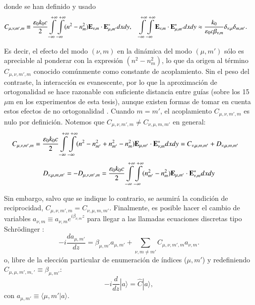 donde se han definido y usado
\begin{align*}
	   C_{\mu, \nu, m', m} &\equiv \frac{\epsilon_0 k_0 c}{2}\int\displaylimits_{-\infty}^{+\infty}\int\displaylimits_{-\infty}^{+\infty} (n^2 - n^2_{m}) \textbf{E}_{\nu, m} \cdot \textbf{E}_{\mu, m'}^* dxdy , \quad\int\displaylimits_{-\infty}^{+\infty}\int\displaylimits_{-\infty}^{+\infty} \textbf{E}_{\nu, m} \cdot \textbf{E}_{\mu, m'}^* dxdy \approx \frac{k_0}{\epsilon_0 c \beta_{\nu, m}} \delta_{\nu,\mu}\delta_{m,m'}.
\end{align*}

Es decir, el efecto del modo $(\nu, m)$ en la dinámica del modo $(\mu, m')$ sólo es apreciable al ponderar con la expresión $(n^2 - n^2_{m})$, lo que da origen al término $C_{\mu, \nu, m', m}$ conocido comúnmente como constante de acoplamiento. Sin el peso del contraste, la interacción es evanescente, por lo que la aproximación de ortogonalidad se hace razonable con suficiente distancia entre guías (sobre los 15 $\mu$m en los experimentos de esta tesis), aunque existen formas de tomar en cuenta estos efectos de no ortogonalidad \citep{schulz_geometric_2022}. Cuando $m=m'$, el acoplamiento $C_{\mu, \nu, m', m}$ es nulo por definición. Notemos que $C_{\mu, \nu, m', m} \neq C_{\nu, \mu, m, m'}$ en general:
\begin{align*}
	C_{\mu, \nu, m', m} &= \frac{\epsilon_0 k_0 c}{2}\int\displaylimits_{-\infty}^{+\infty}\int\displaylimits_{-\infty}^{+\infty} (n^2 - n^2_{m'} + n^2_{m'} - n^2_{m}) \textbf{E}_{\mu, m'} \cdot \textbf{E}_{\nu, m}^* dxdy = C_{\nu, \mu, m, m'} + D_{\nu, \mu, m, m'}
\end{align*}
\begin{equation*}
 D_{\nu, \mu, m, m'} = -D_{\mu, \nu, m', m} = \frac{\epsilon_0 k_0 c}{2}\int\displaylimits_{-\infty}^{+\infty}\int\displaylimits_{-\infty}^{+\infty} (n^2_{m'}- n^2_{m}) \textbf{E}_{\mu, m'} \cdot \textbf{E}_{\nu, m}^*   dxdy
\end{equation*}

Sin embargo, salvo que se indique lo contrario, se asumirá la condición de reciprocidad, $C_{\mu, \nu, m', m} = C_{\nu, \mu, m, m'}$. Finalmente, es posible hacer el cambio de variables $a_{\nu, m} \equiv a_{\nu, m} e^{i\beta_{\nu, m} z}$ para llegar a las llamadas ecuaciones discretas tipo Schrödinger \cite{discretesolitons, artificialFB, FBdynamics}:
\begin{equation}
	  	 -i\frac{d a_{\mu, m'}}{dz} = \beta_{\mu, m'} a_{\mu, m'} + \sum_{\nu, m\neq m'}C_{\mu, \nu, m', m}   a_{\nu, m}.
	\label{eqn:CMT1}
\end{equation}
o, libre de la elección particular de enumeración de índices ($\mu, m'$) y redefiniendo $C_{\mu, \mu, m', m,'} \equiv \beta_{\mu, m'}$:
\begin{equation}
	-i\frac{d }{d z} |a\rangle  = \hat{C} |a\rangle, \label{eqn:CMT_mat}
\end{equation}
con $a_{\mu, m'} \equiv \langle \mu, m' | a \rangle$.


